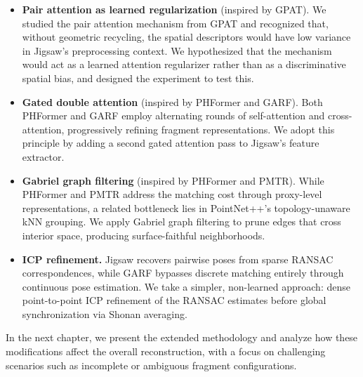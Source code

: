 \begin{itemize}
    \item \textbf{Pair attention as learned regularization} (inspired by GPAT). We studied the pair attention mechanism from GPAT and recognized that, without geometric recycling, the spatial descriptors would have low variance in Jigsaw's preprocessing context. We hypothesized that the mechanism would act as a learned attention regularizer rather than as a discriminative spatial bias, and designed the experiment to test this.

    \item \textbf{Gated double attention} (inspired by PHFormer and GARF). Both PHFormer and GARF employ alternating rounds of self-attention and cross-attention, progressively refining fragment representations. We adopt this principle by adding a second gated attention pass to Jigsaw's feature extractor.

    \item \textbf{Gabriel graph filtering} (inspired by PHFormer and PMTR). While PHFormer and PMTR address the matching cost through proxy-level representations, a related bottleneck lies in PointNet++'s topology-unaware kNN grouping. We apply Gabriel graph filtering \cite{gabriel1969new} to prune edges that cross interior space, producing surface-faithful neighborhoods.

    \item \textbf{ICP refinement.} Jigsaw recovers pairwise poses from sparse RANSAC correspondences, while GARF bypasses discrete matching entirely through continuous pose estimation. We take a simpler, non-learned approach: dense point-to-point ICP refinement of the RANSAC estimates before global synchronization via Shonan averaging.
\end{itemize}

In the next chapter, we present the extended methodology and analyze how these modifications affect the overall reconstruction, with a focus on challenging scenarios such as incomplete or ambiguous fragment configurations.